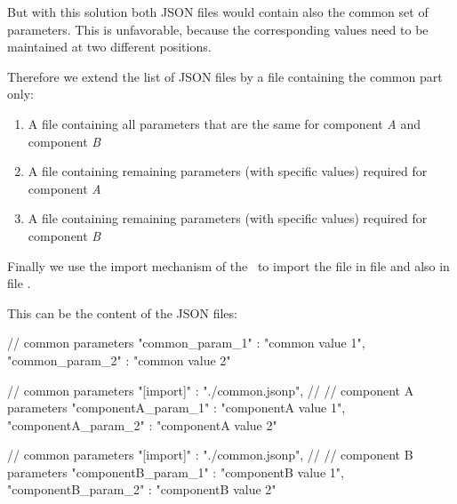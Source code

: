 But with this solution both JSON files would contain also the common set of parameters. This is unfavorable, because
the corresponding values need to be maintained at two different positions.

Therefore we extend the list of JSON files by a file containing the common part only:

\begin{enumerate}
   \item A file  containing all parameters that are the same for component \textit{A} and component \textit{B}
   \item A file  containing remaining parameters (with specific values) required for component \textit{A}
   \item A file  containing remaining parameters (with specific values) required for component \textit{B}
\end{enumerate}

Finally we use the import mechanism of the \pkg\ to import the file  in file  and also in
file .

\vspace{2ex}

This can be the content of the JSON files:

\vspace{2ex}

\textbullet {}

\begin{pythoncode}
{
   // common parameters
   "common_param_1" : "common value 1",
   "common_param_2" : "common value 2"
}
\end{pythoncode}

\textbullet {}

\begin{pythoncode}[linebackgroundcolor=\hlcode{3}]
{
   // common parameters
   "[import]" : "./common.jsonp",
   //
   // component A parameters
   "componentA_param_1" : "componentA value 1",
   "componentA_param_2" : "componentA value 2"
}
\end{pythoncode}

\textbullet {}

\begin{pythoncode}[linebackgroundcolor=\hlcode{3}]
{
   // common parameters
   "[import]" : "./common.jsonp",
   //
   // component B parameters
   "componentB_param_1" : "componentB value 1",
   "componentB_param_2" : "componentB value 2"
}
\end{pythoncode}

